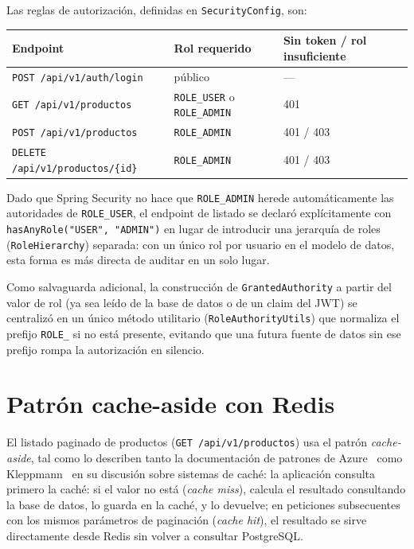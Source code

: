 \documentclass[11pt,a4paper]{article}
\begin{document}
Las reglas de autorización, definidas en \texttt{SecurityConfig}, son:

\begin{center}
\begin{tabular}{@{}lll@{}}
\toprule
Endpoint & Rol requerido & Sin token / rol insuficiente \\
\midrule
\texttt{POST /api/v1/auth/login} & público & --- \\
\texttt{GET /api/v1/productos} & \texttt{ROLE\_USER} o \texttt{ROLE\_ADMIN} & 401 \\
\texttt{POST /api/v1/productos} & \texttt{ROLE\_ADMIN} & 401 / 403 \\
\texttt{DELETE /api/v1/productos/\{id\}} & \texttt{ROLE\_ADMIN} & 401 / 403 \\
\bottomrule
\end{tabular}
\end{center}

Dado que Spring Security no hace que \texttt{ROLE\_ADMIN} herede automáticamente
las autoridades de \texttt{ROLE\_USER}, el endpoint de listado se declaró
explícitamente con \texttt{hasAnyRole("USER", "ADMIN")} en lugar de introducir
una jerarquía de roles (\texttt{RoleHierarchy}) separada: con un único rol por
usuario en el modelo de datos, esta forma es más directa de auditar en un solo
lugar.

Como salvaguarda adicional, la construcción de \texttt{GrantedAuthority} a
partir del valor de rol (ya sea leído de la base de datos o de un claim del
JWT) se centralizó en un único método utilitario (\texttt{RoleAuthorityUtils})
que normaliza el prefijo \texttt{ROLE\_} si no está presente, evitando que una
futura fuente de datos sin ese prefijo rompa la autorización en silencio.

\section{Patrón cache-aside con Redis}

El listado paginado de productos (\texttt{GET /api/v1/productos}) usa el patrón
\emph{cache-aside}, tal como lo describen tanto la documentación de patrones de
Azure~\cite{msftcacheaside} como Kleppmann~\cite{kleppmann2017ddia} en su
discusión sobre sistemas de caché: la aplicación consulta primero la caché: si
el valor no está (\emph{cache miss}), calcula el resultado consultando la base
de datos, lo guarda en la caché, y lo devuelve; en peticiones subsecuentes con
los mismos parámetros de paginación (\emph{cache hit}), el resultado se sirve
directamente desde Redis sin volver a consultar PostgreSQL.
\end{document}

